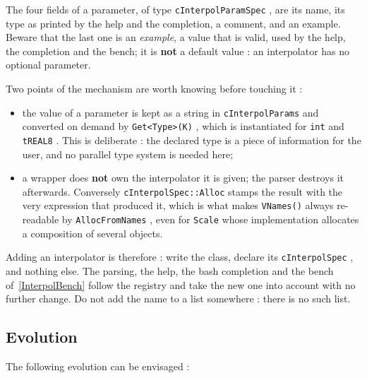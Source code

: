 The four fields of a parameter, of type {\tt cInterpolParamSpec} , are its name, its type as
printed by the help and the completion, a comment, and an example.  Beware that the last one is
an \emph{example}, a value that is valid, used by the help, the completion and the bench; it is
\textbf{not} a default value : an interpolator has no optional parameter.

Two points of the mechanism are worth knowing before touching it :

\begin{itemize}
    \item the value of a parameter is kept as a string in {\tt cInterpolParams} and converted on
          demand by {\tt Get<Type>(K)} , which is instantiated for {\tt int} and {\tt tREAL8} .
          This is deliberate : the declared type is a piece of information for the user, and no
          parallel type system is needed here;
    \item a wrapper does \textbf{not} own the interpolator it is given; the parser destroys it
          afterwards.  Conversely {\tt cInterpolSpec::Alloc} stamps the result with the very
          expression that produced it, which is what makes {\tt VNames()} always re-readable by
          {\tt AllocFromNames} , even for {\tt Scale} whose implementation allocates a
          composition of several objects.
\end{itemize}

Adding an interpolator is therefore : write the class, declare its {\tt cInterpolSpec} , and
nothing else.  The parsing, the help, the bash completion and the bench of~\ref{InterpolBench}
follow the registry and take the new one into account with no further change.  Do not add the
name to a list somewhere : there is no such list.


\subsection{Evolution}

The following evolution can be envisaged :

